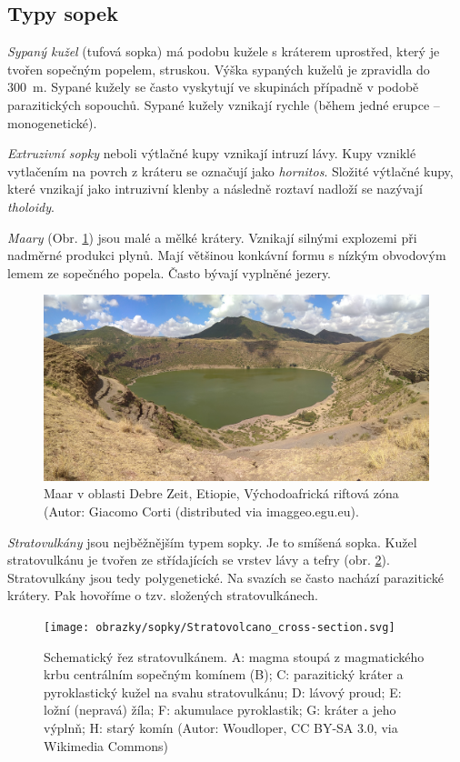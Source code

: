 \subsection{Typy sopek}
\emph{Sypaný kužel} (tufová sopka) má podobu kužele s kráterem uprostřed, který je tvořen sopečným popelem,  struskou. Výška sypaných kuželů je zpravidla do \SI{300}{\metre}. Sypané kužely se často vyskytují ve skupinách případně v podobě parazitických sopouchů. Sypané kužely vznikají rychle (během jedné erupce -- monogenetické). 

\emph{Extruzivní sopky} neboli výtlačné kupy vznikají intruzí lávy. Kupy vzniklé vytlačením na povrch z kráteru se označují jako \emph{hornitos}. Složité výtlačné kupy, které vnzikají jako intruzivní klenby a následně roztaví nadloží se nazývají \emph{tholoidy}.

\emph{Maary} (Obr. \ref{fig:maar}) jsou malé a mělké krátery. Vznikají silnými explozemi při nadměrné produkci plynů. Mají většinou konkávní formu s nízkým obvodovým lemem ze sopečného popela. Často bývají vyplněné jezery.

\begin{figure}[h]
\includegraphics[width=\linewidth]{obrazky/sopky/maar}
\caption{Maar v oblasti Debre Zeit, Etiopie, Východoafrická riftová zóna (Autor: Giacomo Corti (distributed via imaggeo.egu.eu).}
\label{fig:maar}
\end{figure}

\emph{Stratovulkány} jsou nejběžnějším typem sopky. Je to smíšená sopka. Kužel stratovulkánu je tvořen ze střídajících se vrstev lávy a tefry (obr. \ref{fig:stratovulkan_rez}). Stratovulkány jsou tedy polygenetické. Na svazích se často nachází parazitické krátery. Pak hovoříme o tzv. složených stratovulkánech. 

\begin{figure}[h]
	\centering
	\texttt{[image: obrazky/sopky/Stratovolcano\_cross-section.svg]}
	\caption{Schematický řez stratovulkánem. A: magma stoupá z magmatického krbu centrálním sopečným komínem (B); C: parazitický kráter a pyroklastický kužel na svahu stratovulkánu; D: lávový proud; E: ložní (nepravá) žíla; F: akumulace pyroklastik; G: kráter a jeho výplnň; H: starý komín (Autor: Woudloper, CC BY-SA 3.0, via Wikimedia Commons)}
	\label{fig:stratovulkan_rez}
\end{figure}




